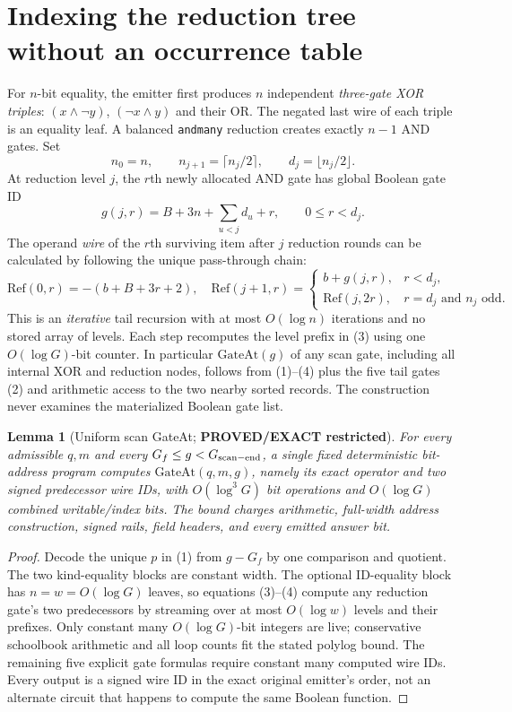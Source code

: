 \documentclass[11pt]{article}
\newtheorem{lemma}[theorem]{Lemma}
\begin{document}
\section{Indexing the reduction tree without an occurrence table}
For $n$-bit equality, the emitter first produces $n$ independent \emph{three-gate XOR triples}: $(x\land\neg y)$, $(\neg x\land y)$ and their OR. The negated last wire of each triple is an equality leaf. A balanced \texttt{andmany} reduction creates exactly $n-1$ AND gates. Set
\[
 n_0=n,\qquad n_{j+1}=\lceil n_j/2\rceil,
\qquad d_j=\lfloor n_j/2\rfloor.
\]
At reduction level $j$, the $r$th newly allocated AND gate has global Boolean gate ID
\[
 g(j,r)=B+3n+\sum_{u<j}d_u+r,
 \qquad 0\le r<d_j.\tag{3}
\]
The operand \emph{wire} of the $r$th surviving item after $j$ reduction rounds can be calculated by following the unique pass-through chain:
\[
\mathrm{Ref}(0,r)=-(b+B+3r+2),\quad
\mathrm{Ref}(j+1,r)=
\begin{cases}
 b+g(j,r),&r<d_j,\\
 \mathrm{Ref}(j,2r),&r=d_j\text{ and }n_j\text{ odd}.
\end{cases}\tag{4}
\]
This is an \emph{iterative} tail recursion with at most $O(\log n)$ iterations and no stored array of levels. Each step recomputes the level prefix in (3) using one $O(\log G)$-bit counter. In particular \(\mathrm{GateAt}(g)\) of any scan gate, including all internal XOR and reduction nodes, follows from (1)--(4) plus the five tail gates (2) and arithmetic access to the two nearby sorted records. The construction never examines the materialized Boolean gate list.

\begin{lemma}[Uniform scan GateAt; \textbf{PROVED/EXACT restricted}]
For every admissible $q,m$ and every $G_f\le g<G_{\rm scan-end}$, a single fixed deterministic bit-address program computes \(\mathrm{GateAt}(q,m,g)\), namely its exact operator and two signed predecessor wire IDs, with $O(\log^3G)$ bit operations and $O(\log G)$ combined writable/index bits. The bound charges arithmetic, full-width address construction, signed rails, field headers, and every emitted answer bit.
\end{lemma}
\begin{proof}
Decode the unique $p$ in (1) from $g-G_f$ by one comparison and quotient. The two kind-equality blocks are constant width. The optional ID-equality block has $n=w=O(\log G)$ leaves, so equations (3)--(4) compute any reduction gate's two predecessors by streaming over at most $O(\log w)$ levels and their prefixes. Only constant many $O(\log G)$-bit integers are live; conservative schoolbook arithmetic and all loop counts fit the stated polylog bound. The remaining five explicit gate formulas require constant many computed wire IDs. Every output is a signed wire ID in the exact original emitter's order, not an alternate circuit that happens to compute the same Boolean function.
\end{proof}
\end{document}
